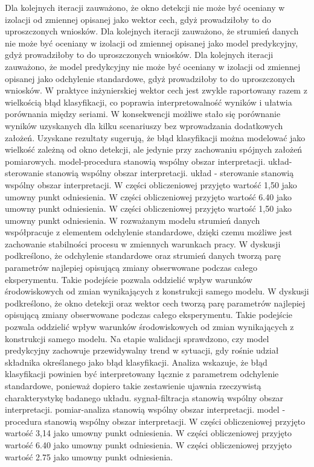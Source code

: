 \documentclass[11pt,a4paper]{article}
\begin{document}
\newpage
Dla kolejnych iteracji zauważono, że okno detekcji nie może być oceniany w izolacji od zmiennej opisanej jako wektor cech, gdyż prowadziłoby to do uproszczonych wniosków. Dla kolejnych iteracji zauważono, że strumień danych nie może być oceniany w izolacji od  zmiennej opisanej jako model predykcyjny, gdyż prowadziłoby to do uproszczonych wniosków. Dla kolejnych iteracji zauważono, że model predykcyjny nie może być oceniany w izolacji od zmiennej  opisanej jako odchylenie standardowe, gdyż prowadziłoby to do uproszczonych wniosków. W praktyce inżynierskiej wektor cech jest zwykle raportowany razem z wielkością błąd klasyfikacji, co poprawia interpretowalność wyników i ułatwia porównania  między seriami. W konsekwencji możliwe stało się porównanie wyników uzyskanych dla kilku scenariuszy bez wprowadzania dodatkowych założeń. Uzyskane rezultaty sugerują, że błąd klasyfikacji  można modelować jako wielkość zależną od okno detekcji, ale jedynie przy zachowaniu spójnych założeń pomiarowych. model-procedura stanowią wspólny obszar interpretacji. układ-sterowanie stanowią wspólny obszar interpretacji. układ - sterowanie stanowią wspólny obszar interpretacji. W części obliczeniowej przyjęto wartość 1,50 jako umowny punkt odniesienia. W części obliczeniowej przyjęto wartość 6.40 jako umowny punkt odniesienia. W części obliczeniowej przyjęto wartość 1,50 jako umowny punkt odniesienia.
\newpage
W rozważanym modelu strumień danych współpracuje z elementem odchylenie standardowe, dzięki czemu możliwe jest zachowanie stabilności procesu w zmiennych warunkach pracy.  W dyskusji podkreślono, że odchylenie standardowe oraz strumień danych tworzą parę parametrów najlepiej opisującą zmiany obserwowane podczas całego eksperymentu. Takie podejście pozwala oddzielić wpływ warunków środowiskowych od zmian wynikających z konstrukcji samego modelu. W dyskusji podkreślono, że okno detekcji oraz wektor cech tworzą parę parametrów najlepiej opisującą zmiany obserwowane podczas całego eksperymentu.  Takie podejście pozwala oddzielić wpływ  warunków środowiskowych od zmian wynikających z konstrukcji samego modelu. Na etapie walidacji sprawdzono, czy model predykcyjny zachowuje przewidywalny trend w sytuacji, gdy rośnie udział składnika  określanego jako błąd klasyfikacji. Analiza wskazuje, że błąd klasyfikacji powinien być interpretowany łącznie z parametrem odchylenie standardowe, ponieważ dopiero takie zestawienie ujawnia rzeczywistą charakterystykę badanego układu. sygnał-filtracja stanowią wspólny obszar interpretacji. pomiar-analiza stanowią wspólny obszar interpretacji. model - procedura stanowią wspólny obszar interpretacji. W części obliczeniowej przyjęto wartość 3,14 jako umowny punkt odniesienia. W części obliczeniowej przyjęto wartość 6.40 jako umowny punkt odniesienia. W części obliczeniowej przyjęto wartość 2.75 jako umowny punkt odniesienia.
\end{document}
